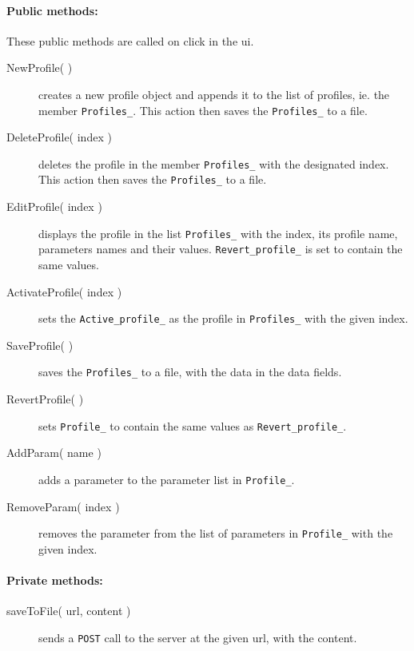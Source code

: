 \paragraph{Public methods:}
These public methods are called on click in the ui.
\begin{adjustwidth}{2.5em}{0pt}\begin{description}
	\item[NewProfile( )] creates a new profile object and appends it to the list of profiles, ie. the member \texttt{Profiles_}. This action then saves the \texttt{Profiles_} to a file.
	\item[DeleteProfile( index )] deletes the profile in the member \texttt{Profiles_} with the designated index. This action then saves the \texttt{Profiles_} to a file.
	\item[EditProfile( index )] displays the profile in the list \texttt{Profiles_} with the index, its profile name, parameters names and their values. \texttt{Revert_profile_} is set to contain the same values.
	\item[ActivateProfile( index )] sets the \texttt{Active_profile_} as the profile in \texttt{Profiles_} with the given index.
	\item[SaveProfile( )]  saves the \texttt{Profiles_} to a file, with the data in the data fields.
	\item[RevertProfile( )] sets \texttt{Profile_} to contain the same values as \texttt{Revert_profile_}.
	\item[AddParam( name )] adds a parameter to the parameter list in \texttt{Profile_}.
	\item[RemoveParam( index )] removes the parameter from the list of parameters in \texttt{Profile_} with the given index.
\end{description}\end{adjustwidth}


\paragraph{Private methods:}
\begin{adjustwidth}{2.5em}{0pt}\begin{description}
	\item[saveToFile( url, content )] sends a \texttt{POST} call to the server at the given url, with the content.
\end{description}\end{adjustwidth}

